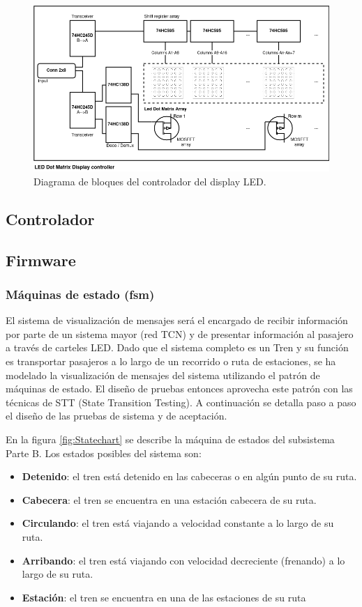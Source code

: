 \documentclass[
11pt, %
]{charter}
\begin{document}
\begin{figure}[htpb]
\centering 
\includegraphics[width=1\textwidth]{./Pics/blockDiagram.png}
\caption{Diagrama de bloques del controlador del display LED.}
\label{fig:blockDiagram LED display}
\end{figure}

\subsection{Controlador}


\subsection{Firmware}

\subsubsection{Máquinas de estado (fsm)}
El sistema de visualización de mensajes será el encargado de recibir información por parte de un sistema mayor (red TCN) y de presentar información al pasajero a través de carteles LED. Dado que el sistema completo es un Tren y su función es transportar pasajeros a lo largo de un recorrido o ruta de
estaciones, se ha modelado la visualización de mensajes del sistema  utilizando el patrón de máquinas de estado. El diseño de pruebas entonces aprovecha este patrón con las técnicas de STT
(State Transition Testing). A continuación se detalla paso a paso el diseño de las pruebas de sistema y de aceptación. 

En la figura \ref{fig:Statechart} se describe la máquina de estados del subsistema Parte B. Los estados posibles
del sistema son:
\begin{itemize}
\item \textbf{Detenido}: el tren está detenido en las cabeceras o en algún punto de su ruta.
\item \textbf{Cabecera}: el tren se encuentra en una estación cabecera de su ruta.
\item \textbf{Circulando}: el tren está viajando a velocidad constante a lo largo de su ruta.
\item \textbf{Arribando}: el tren está viajando con velocidad decreciente (frenando) a lo largo de su
ruta.
\item \textbf{Estación}: el tren se encuentra en una de las estaciones de su ruta
\end{itemize}
\end{document}
